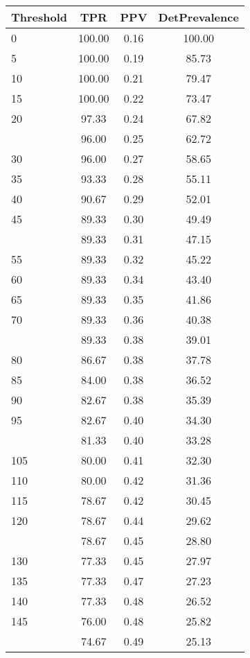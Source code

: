 \begin{table}[ht]
\centering
\begin{tabular}{lccc}
  \toprule
Threshold & TPR & PPV & DetPrevalence \\ 
  \midrule
0 & 100.00 & 0.16 & 100.00 \\ 
  5 & 100.00 & 0.19 & 85.73 \\ 
  10 & 100.00 & 0.21 & 79.47 \\ 
  15 & 100.00 & 0.22 & 73.47 \\ 
  20 & 97.33 & 0.24 & 67.82 \\ 
   \addlinespace
25 & 96.00 & 0.25 & 62.72 \\ 
  30 & 96.00 & 0.27 & 58.65 \\ 
  35 & 93.33 & 0.28 & 55.11 \\ 
  40 & 90.67 & 0.29 & 52.01 \\ 
  45 & 89.33 & 0.30 & 49.49 \\ 
   \addlinespace
50 & 89.33 & 0.31 & 47.15 \\ 
  55 & 89.33 & 0.32 & 45.22 \\ 
  60 & 89.33 & 0.34 & 43.40 \\ 
  65 & 89.33 & 0.35 & 41.86 \\ 
  70 & 89.33 & 0.36 & 40.38 \\ 
   \addlinespace
75 & 89.33 & 0.38 & 39.01 \\ 
  80 & 86.67 & 0.38 & 37.78 \\ 
  85 & 84.00 & 0.38 & 36.52 \\ 
  90 & 82.67 & 0.38 & 35.39 \\ 
  95 & 82.67 & 0.40 & 34.30 \\ 
   \addlinespace
100 & 81.33 & 0.40 & 33.28 \\ 
  105 & 80.00 & 0.41 & 32.30 \\ 
  110 & 80.00 & 0.42 & 31.36 \\ 
  115 & 78.67 & 0.42 & 30.45 \\ 
  120 & 78.67 & 0.44 & 29.62 \\ 
   \addlinespace
125 & 78.67 & 0.45 & 28.80 \\ 
  130 & 77.33 & 0.45 & 27.97 \\ 
  135 & 77.33 & 0.47 & 27.23 \\ 
  140 & 77.33 & 0.48 & 26.52 \\ 
  145 & 76.00 & 0.48 & 25.82 \\ 
   \addlinespace
150 & 74.67 & 0.49 & 25.13 \\ 

\end{tabular}
\end{table}
